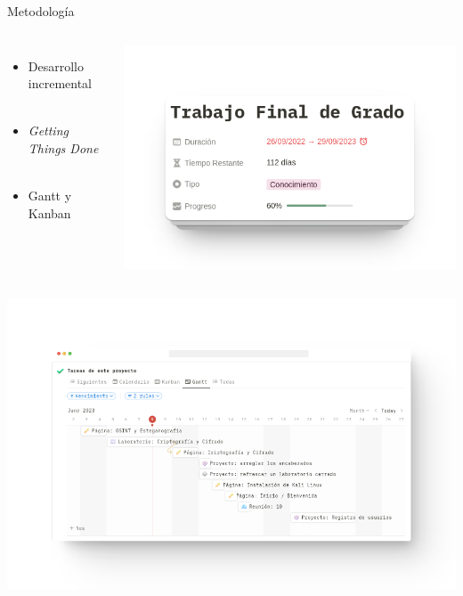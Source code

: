     \begin{frame}{Metodología}
        \begin{columns}[c]
                \begin{itemize}
                    \item Desarrollo incremental
                    \\~\\
                    \item \textit{Getting Things Done}
                    \\~\\
                    \item Gantt y Kanban
                \end{itemize}
            
                \includegraphics[scale=0.25]{images/capturas/notion/resumen.png}
        \end{columns}
    \end{frame}

    \begin{frame}
        \centering

        \includegraphics[scale=0.3]{images/capturas/notion/gantt.png}
    \end{frame}

